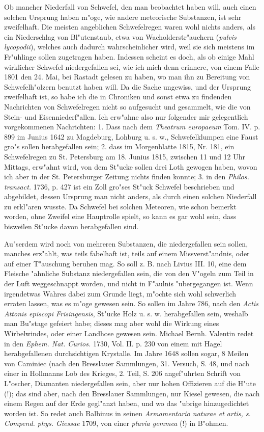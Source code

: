 \documentclass[a4paper, 11pt, oneside, polutonikogreek, german]{article}
\begin{document}
Ob mancher Niederfall von Schwefel, den man beobachtet haben will, auch einen solchen Ursprung haben m"oge, wie andere meteorische Substanzen, ist sehr zweifelhaft. Die meisten angeblichen Schwefelregen waren wohl nichts anders, als ein Niederschlag von Bl"utenstaub, etwa von Wacholderstr"auchern (\emph{pulvis lycopodii}), welches auch dadurch wahrscheinlicher wird, weil sie sich meistens im Fr"uhlinge sollen zugetragen haben. Indessen scheint es doch, als ob einige Mahl wirklicher Schwefel niedergefallen sei, wie ich mich denn erinnere, von einem Falle 1801 den 24. Mai, bei Rastadt gelesen zu haben, wo man ihn zu Bereitung von Schwefelh"olzern benutzt haben will. Da die Sache ungewiss, und der Ursprung zweifelhaft ist, so habe ich die in Chroniken und sonst etwa zu findenden Nachrichten von Schwefelregen nicht so aufgesucht und gesammelt, wie die von Stein- und Eisenniederf"allen. Ich erw"ahne also nur folgender mir gelegentlich vorgekommenen Nachrichten: 1. Dass nach dem \emph{Theatrum europaeum} Tom. IV. p. 899 im Junius 1642 zu Magdeburg, Lohburg u. s. w., Schwefelklumpen eine Faust gro"s sollen herabgefallen sein; 2. dass im Morgenblatte 1815, Nr. 181, ein Schwefelregen zu St. Petersburg am 18. Junius 1815, zwischen 11 und 12 Uhr Mittags, erw"ahnt wird, von dem St"ucke sollen drei Loth gewogen haben, wovon ich aber in der St. Petersburger Zeitung nichts finden konnte; 3. in den \emph{Philos. transact.} 1736, p. 427 ist ein Zoll gro"ses St"uck Schwefel beschrieben und abgebildet, dessen Ursprung man nicht anders, als durch einen solchen Niederfall zu erkl"aren wusste. Da Schwefel bei solchen Meteoren, wie schon bemerkt worden, ohne Zweifel eine Hauptrolle spielt, so kann es gar wohl sein, dass bisweilen St"ucke davon herabgefallen sind.

Au"serdem wird noch von mehreren Substanzen, die niedergefallen sein sollen, manches erz"ahlt, was teils fabelhaft ist, teils auf einem Missverst"andnis, oder auf einer T"auschung beruhen mag. So soll z. B. nach Livius III. 10, eine dem Fleische "ahnliche Substanz niedergefallen sein, die von den V"ogeln zum Teil in der Luft weggeschnappt worden, und nicht in F"aulnis "ubergegangen ist. Wenn irgendetwas Wahres dabei zum Grunde liegt, m"ochte sich wohl schwerlich erraten lassen, was es m"oge gewesen sein. So sollen im Jahre 786, nach den \emph{Actis Attonis episcopi Frisingensis}, St"ucke Holz u. s. w. herabgefallen sein, weshalb man Bu"stage gefeiert habe; dieses mag aber wohl die Wirkung eines Wirbelwindes, oder einer Landhose gewesen sein. Michael Bernh. Valentin redet in den \emph{Ephem. Nat. Curios.} 1730, Vol. II. p. 230 von einem mit Hagel herabgefallenen durchsichtigen Krystalle. Im Jahre 1648 sollen sogar, 8 Meilen von Caminiec (nach den Bresslauer Sammlungen, 31. Versuch, S. 48, und nach einer in Hollmanns Lob des Krieges, 2. Teil, S. 206 angef"uhrten Schrift von L"oscher, Diamanten niedergefallen sein, aber nur hohen Offizieren auf die H"ute (!); das sind aber, nach den Bresslauer Sammlungen, nur Kiesel gewesen, die nach einem Regen auf der Erde gegl"anzt haben, und wo das "ubrige hinzugedichtet worden ist. So redet auch Balbinus in seinen \emph{Armamentario naturae et artis, s. Compend. phys. Giessae} 1709, von einer \emph{pluvia gemmea} (!) in B"ohmen.
\end{document}
